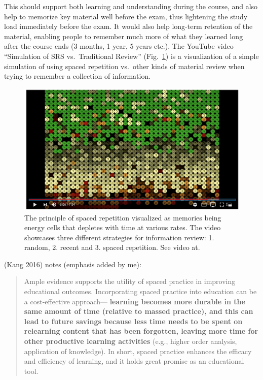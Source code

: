 This should support both learning and understanding during the course,
and also help to memorize key material well before the exam, thus
lightening the study load immediately before the exam. It would also
help long-term retention of the material, enabling people to remember
much more of what they learned long after the course ends (3 months, 1
year, 5 years etc.). The YouTube video ``Simulation of SRS
vs.~Traditional Review'' (Fig.~\ref{fig:memory-cells}) is a
visualization of a simple simulation of using spaced repetition
vs.~other kinds of material review when trying to remember a collection
of information.

\begin{figure}
\centering
\includegraphics{assets/memory-cells.png}
\caption[The principle of spaced repetition visualized as memories being
energy cells that depletes with time at various rates. The video
showcases three different strategies for information review: 1. random,
2. recent and 3. spaced repetition. See video at.]{The principle of
spaced repetition visualized as memories being energy cells that
depletes with time at various rates. The video showcases three different
strategies for information review: 1. random, 2. recent and 3. spaced
repetition. See video at.\footnotemark{}}\label{fig:memory-cells}
\end{figure}

(Kang 2016) notes (emphasis added by me):

\begin{quote}
Ample evidence supports the utility of spaced practice in improving
educational outcomes. Incorporating spaced practice into education can
be a cost-effective approach--- \textbf{learning becomes more durable in
the same amount of time (relative to massed practice), and this can lead
to future savings because less time needs to be spent on relearning
content that has been forgotten, leaving more time for other productive
learning activities} (e.g., higher order analysis, application of
knowledge). In short, spaced practice enhances the efficacy and
efficiency of learning, and it holds great promise as an educational
tool.
\end{quote}

